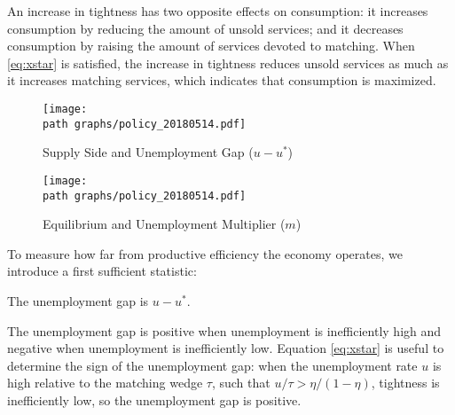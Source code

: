 \documentclass[letterpaper,12pt,leqno]{article}
\begin{document}
\begin{bibunit}
An increase in tightness has two opposite effects on consumption: it increases consumption by reducing the amount of unsold services; and it decreases consumption by raising the amount of services devoted to matching. When \eqref{eq:xstar} is satisfied, the increase in tightness reduces unsold services as much as it increases matching services, which indicates that consumption is maximized. 

\begin{figure}[p]\centering
\texttt{[image: \\path graphs/policy\_20180514.pdf]}
\caption{Supply Side and Unemployment Gap ($u-u^*$)}
\label{fig:gap}\end{figure}

\begin{figure}[p]\centering
\texttt{[image: \\path graphs/policy\_20180514.pdf]}
\caption{Equilibrium and Unemployment Multiplier ($m$)}
\label{fig:multiplier}\end{figure}

To measure how far from productive efficiency the economy operates, we introduce a first sufficient statistic:

\begin{defn} The unemployment gap is $u-u^{*}$.\end{defn}

The unemployment gap is positive when unemployment is inefficiently high and negative when unemployment is inefficiently low. Equation \eqref{eq:xstar} is useful to determine the sign of the unemployment gap: when the unemployment rate $u$ is high relative to the matching wedge $\tau$, such that $u/\tau > \eta/(1-\eta)$, tightness is inefficiently low, so the unemployment gap is positive.


\end{bibunit}
\end{document}
